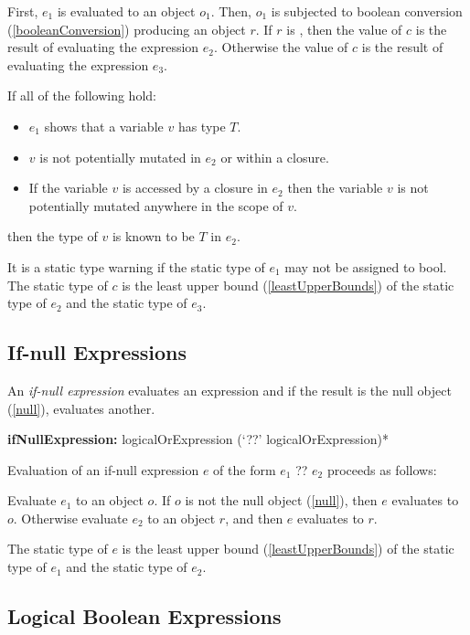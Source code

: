 \documentclass{article}
\newcommand{\code}[1]{{\sf #1}}
\begin{document}
\LMHash{}
First, $e_1$ is evaluated to an object $o_1$.  Then, $o_1$ is  subjected to boolean conversion (\ref{booleanConversion}) producing an object $r$.  If $r$ is \TRUE, then the value of $c$ is the result of evaluating the expression $e_2$. Otherwise the value of $c$ is the result of evaluating the expression $e_3$.

\LMHash{}
If all of the following hold:
\begin{itemize}
\item $e_1$ shows that a variable $v$ has type $T$.
\item $v$ is not potentially mutated in $e_2$ or within a closure.
\item If the variable $v$ is accessed by a closure in $e_2$ then the variable $v$ is not potentially mutated anywhere in the scope of $v$.
\end{itemize}

then the type of $v$ is known to be $T$ in $e_2$.


\LMHash{}
It is a static type warning if the static type of $e_1$ may not be assigned to \code{bool}.  The static type of $c$ is the least upper bound (\ref{leastUpperBounds}) of the static type of $e_2$ and the static type of $e_3$.


\subsection{If-null Expressions}
\label{ifNull}

\LMHash{}
An {\em if-null expression} evaluates an expression and if the result is the null object (\ref{null}), evaluates another.

\begin{grammar}
{\bf ifNullExpression:}
  logicalOrExpression (`??' logicalOrExpression)*
\end{grammar}

\LMHash{}
Evaluation of an if-null expression $e$ of the form \code{$e_1$ ?? $e_2$}
proceeds as follows:

\LMHash{}
Evaluate $e_1$ to an object $o$.
If $o$ is not the null object (\ref{null}), then $e$ evaluates to $o$.
Otherwise evaluate $e_2$ to an object $r$,
and then $e$ evaluates to $r$.

\LMHash{}
The static type of $e$ is the least upper bound (\ref{leastUpperBounds}) of the static type of $e_1$ and the static type of $e_2$.


\subsection{ Logical Boolean Expressions}
\end{document}
